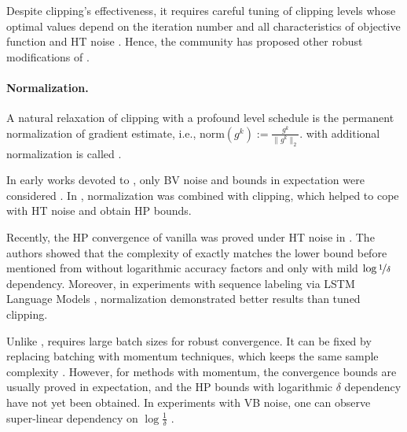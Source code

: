 Despite clipping's effectiveness, it requires careful tuning of clipping levels whose optimal values depend on the iteration number and all characteristics of objective function and HT noise \citep[Theorem $3.1$]{sadiev2023high}. Hence, the community has proposed other robust modifications of .   
 \vspace{-20pt}
\paragraph{Normalization.}
A natural relaxation of clipping with a profound level schedule is the permanent normalization of gradient estimate, i.e., $\text{norm}(g^k) := \frac{g^k}{\|g^k\|_2}.$  with additional normalization is called  \cite{hazan2015beyond}.


In early works devoted to , only BV noise and bounds in expectation were considered \cite{barakat2023reinforcement, yang2024two}. In \cite{liu2023breaking, cutkosky2021high}, normalization was combined with clipping, which helped to cope with HT noise and obtain HP bounds.

Recently, the HP convergence of vanilla  was proved under HT noise in \cite{hubler2024gradient}. The authors showed that the complexity of  exactly matches the lower bound before mentioned from \cite{zhang2020adaptivegood} without logarithmic accuracy factors and only with mild $\log\nicefrac{1}{\delta}$ dependency. Moreover, in experiments with sequence labeling via LSTM Language Models \cite{merity2017regularizing}, normalization demonstrated better results than tuned clipping.  

Unlike ,  requires large batch sizes for robust convergence. It can be fixed by replacing batching with momentum techniques, which keeps the same sample complexity \cite{cutkosky2020momentum}. However, for methods with momentum, the convergence bounds are usually proved in expectation, and the HP bounds with logarithmic $\delta$ dependency have not yet been obtained. In experiments with VB noise, one can observe super-linear dependency on $\log \frac{1}{\delta}$ \cite{hubler2024gradient}.

